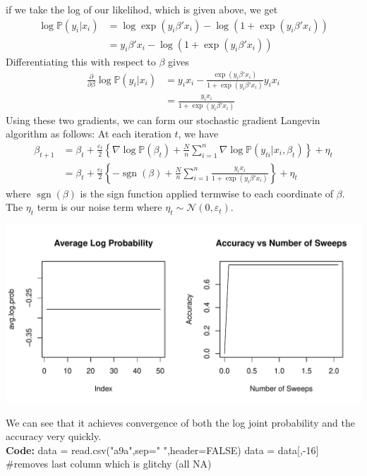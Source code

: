 \documentclass[letterpaper,12pt]{amsart}
\newcommand{\sumin}{\sum_{i=1}^n}
\newcommand{\p}[1]{\mathbb{P}\!\left(#1\right)}
\newcommand{\sgn}{\operatorname{sgn}}
\newcommand{\sN}{\mathcal{N}}
\newenvironment{verbatimcode}{\bigskip \scriptsize \verbatim}{\endverbatim \normalsize \bigskip}
\begin{document}
\begin{enumerate}[1.]
if we take the log of our likelihod, which is given above, we get
\begin{align*}
\log \p{y_i | x_i} &= \log \exp(y_i \beta' x_i) - \log (1 + \exp(y_i \beta' x_i))\\
&= y_i \beta' x_i - \log (1 + \exp(y_i \beta' x_i))
\end{align*}
Differentiating this with respect to $\beta$ gives
\begin{align*}
\frac{\partial}{\partial \beta} \log \p{y_i | x_i} &= y_i x_i - \frac{\exp(y_i \beta' x_i)}{1 + \exp(y_i \beta' x_i)} y_i x_i\\
&= \frac{y_i x_i}{1 + \exp(y_i \beta' x_i)}
\end{align*}
Using these two gradients, we can form our stochastic gradient Langevin algorithm as follows: At each iteration $t$, we have
\begin{align*}
\beta_{t+1} &= \beta_t + \frac{\varepsilon_t}{2}\left\{\nabla \log \p{\beta_t} + \frac{N}{n} \sumin \nabla \log \p{y_{ti} | x_i, \beta_t} \right\} + \eta_t\\
&= \beta_t + \frac{\varepsilon_t}{2}\left\{-\sgn(\beta) + \frac{N}{n} \sumin \frac{y_i x_i}{1 + \exp(y_i \beta' x_i)}\right\} + \eta_t
\end{align*}
where $\sgn(\beta)$ is the sign function applied termwise to each coordinate of $\beta$. The $\eta_t$ term is our noise term where $\eta_t \sim \sN(0, \varepsilon_t)$.

\begin{center}
\includegraphics[scale=0.5]{fig3.pdf}
\end{center}
We can see that it achieves convergence of both the log joint probability and the accuracy very quickly.\\

\noindent
\textbf{Code:}
\begin{verbatimcode}
data = read.csv("a9a",sep=" ",header=FALSE)
data = data[,-16] #removes last column which is glitchy (all NA)


\end{verbatimcode}
\end{enumerate}
\end{document}
